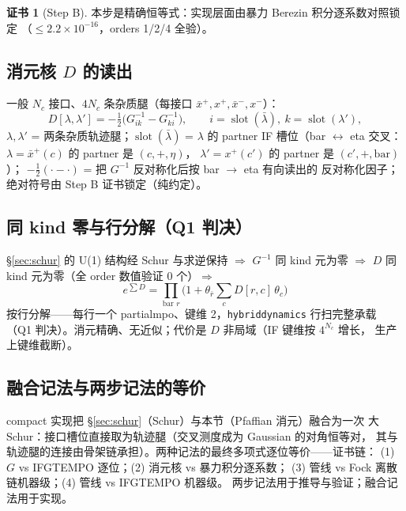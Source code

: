 \documentclass[11pt,a4paper]{ctexart}
\theoremstyle{plain}
\theoremstyle{definition}
\newtheorem{checkcert}[identity]{证书}
\theoremstyle{remark}
\begin{document}
\begin{checkcert}[Step B]
本步是精确恒等式：实现层面由暴力 Berezin 积分逐系数对照锁定
（$\le 2.2\times10^{-16}$，orders 1/2/4 全验）。
\end{checkcert}

\subsection{消元核 \texorpdfstring{$D$}{D} 的读出}\label{sec:D}

一般 $N_c$ 接口、$4N_c$ 条杂质腿（每接口 $\bar x^+, x^+, \bar x^-, x^-$）：
\begin{equation}
D[\lambda,\lambda'] = -\tfrac12\big(G^{-1}_{ik} - G^{-1}_{ki}\big),
\qquad i = \operatorname{slot}(\bar\lambda),\ k = \operatorname{slot}(\lambda'),
\label{eq:D}
\end{equation}
$\lambda, \lambda'$ = 两条杂质轨迹腿；$\operatorname{slot}(\bar\lambda)$ =
$\lambda$ 的 partner IF 槽位（bar $\leftrightarrow$ eta 交叉：
$\lambda = \bar x^{+}(c)$ 的 partner 是 $(c, +, \eta)$，
$\lambda' = x^{+}(c')$ 的 partner 是 $(c', +, \mathrm{bar})$）；
$-\tfrac12(\cdot - \cdot)$ = 把 $G^{-1}$ 反对称化后按 bar $\to$ eta 有向读出的
反对称化因子；绝对符号由 Step B 证书锁定（纯约定）。

\subsection{同 kind 零与行分解（Q1 判决）}\label{sec:rows}

\S\ref{sec:schur} 的 U(1) 结构经 Schur 与求逆保持 $\Rightarrow$ $G^{-1}$ 同 kind
元为零 $\Rightarrow$ $D$ 同 kind 元为零（全 order 数值验证 0 个）$\Rightarrow$
\begin{equation}
e^{\sum D} = \prod_{\text{bar } r}\Big(1 + \theta_{\bar r}\sum_c D[r,c]\,\theta_c\Big)
\end{equation}
按行分解——每行一个 partialmpo、键维 2，\texttt{hybriddynamics} 行扫完整承载
（Q1 判决）。消元精确、无近似；代价是 $D$ 非局域（IF 键维按 $4^{N_c}$ 增长，
生产上键维截断）。

\subsection{融合记法与两步记法的等价}\label{sec:fusion}

compact 实现把 \S\ref{sec:schur}（Schur）与本节（Pfaffian 消元）融合为一次
大 Schur：接口槽位直接取为轨迹腿（交叉测度成为 Gaussian 的对角恒等对，
其与轨迹腿的连接由骨架链承担）。两种记法的最终多项式逐位等价——证书链：
(1) $G$ vs IFGTEMPO 逐位；(2) 消元核 vs 暴力积分逐系数；
(3) 管线 vs Fock 离散链机器级；(4) 管线 vs IFGTEMPO 机器级。
两步记法用于推导与验证；融合记法用于实现。
\end{document}
